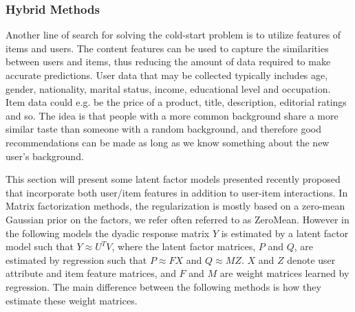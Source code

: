 \subsubsection{Hybrid Methods}


Another line of search for solving the cold-start problem is to utilize
features of items and users. The content features can be used to capture the
similarities between users and items, thus reducing the amount of data required
to make accurate predictions. User data that may be collected typically
includes age, gender, nationality, marital status, income, educational level
and occupation. Item data could e.g. be the price of a product, title,
description, editorial ratings and so. The idea is that people with a more
common background share a more similar taste than someone with a random
background, and therefore good recommendations can be made as long as we know
something about the new user’s background.

This section will present some latent factor models presented recently proposed
that incorporate both user/item features in addition to user-item interactions.
In Matrix factorization methods, the regularization is mostly based on a
zero-mean Gaussian prior on the factors, we refer often referred to as
ZeroMean. However in the following models the dyadic response matrix $Y$ is
estimated by a latent factor model such that $Y \approx U^{T}V$, where the
latent factor matrices, $P$ and $Q$, are estimated by regression such that $P
\approx FX$ and $Q \approx MZ$. $X$ and $Z$ denote user attribute and item
feature matrices, and $F$ and $M$ are weight matrices learned by regression.
The main difference between the following methods is how they estimate these
weight matrices.


